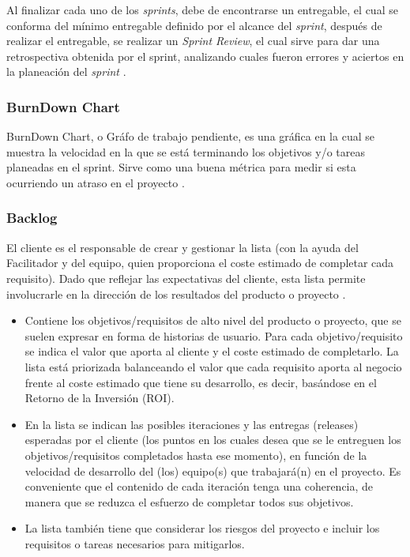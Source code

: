 \documentclass[10pt]{article}
\begin{document}
\setlength{\parskip}{2mm}

Al finalizar cada uno de los \textit{sprints}, debe de encontrarse un entregable, el cual se conforma del mínimo entregable definido por el alcance del \textit{sprint}, después de realizar el entregable, se realizar un \textit{Sprint Review}, el cual sirve para dar una retrospectiva obtenida por el sprint, analizando cuales fueron errores y aciertos en la planeación del \textit{sprint} \cite{IEEEreferencias:Ref21}.\newline

\subsubsection{BurnDown Chart}
BurnDown Chart, o Gráfo de trabajo pendiente, es una gráfica en la cual se muestra la velocidad en la que se está terminando los objetivos y/o tareas planeadas en el sprint. Sirve como una buena métrica para medir si esta ocurriendo un atraso en el proyecto \cite{IEEEreferencias:Ref22}.

\subsubsection{Backlog}
El cliente es el responsable de crear y gestionar la lista (con la ayuda del Facilitador y del equipo, quien proporciona el coste estimado de completar cada requisito). Dado que reflejar las expectativas del cliente, esta lista permite involucrarle en la dirección de los resultados del producto o proyecto \cite{IEEEreferencias:Ref23}.

\begin{itemize}
    \item Contiene los objetivos/requisitos de alto nivel del producto o proyecto, que se suelen expresar en forma de historias de usuario. Para cada objetivo/requisito se indica el valor que aporta al cliente y el coste estimado de completarlo. La lista está priorizada balanceando el valor que cada requisito aporta al negocio frente al coste estimado que tiene su desarrollo, es decir, basándose en el Retorno de la Inversión (ROI).
    
    \item En la lista se indican las posibles iteraciones y las entregas (releases) esperadas por el cliente (los puntos en los cuales desea que se le entreguen los objetivos/requisitos completados hasta ese momento), en función de la velocidad de desarrollo del (los) equipo(s) que trabajará(n) en el proyecto. Es conveniente que el contenido de cada iteración tenga una coherencia, de manera que se reduzca el esfuerzo de completar todos sus objetivos.
    \item La lista también tiene que considerar los riesgos del proyecto e incluir los requisitos o tareas necesarios para mitigarlos\cite{IEEEreferencias:Ref23}.

\end{itemize}
\end{document}
